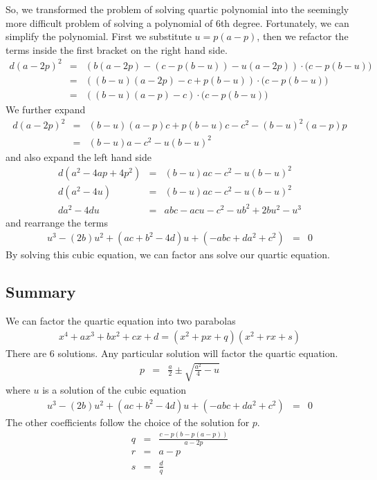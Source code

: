 \documentclass[12pt,a4paper,twoside,openright,BCOR10mm,headsepline,titlepage,abstracton,chapterprefix,final]{scrreprt}
\begin{document}
So, we transformed the problem of solving quartic polynomial into the seemingly more difficult problem of solving a polynomial of 6th degree. Fortunately, we can simplify the polynomial.
First we substitute $u=p(a-p)$, then we refactor the terms inside the first bracket on the right hand side.
\begin{eqnarray}
    d (a-2p)^2 &=& 
    \left(b(a-2p) - (c - p(b - u)) - u(a-2p)\right)
    \cdot
    \big(c - p(b - u)\big)
    \\
    &=& 
    \left((b-u)(a-2p) - c + p(b - u) \right)
    \cdot
    \big(c - p(b - u)\big)
    \\
    &=& 
    \left((b-u)(a-p) - c \right)
    \cdot
    \big(c - p(b - u)\big)
\end{eqnarray}
We further expand
\begin{eqnarray}
    d (a-2p)^2 &=& 
      (b-u)(a-p) c
      + p(b - u) c
      - c^2
      - (b-u)^2(a-p)p
    \\
    &=& (b-u)a - c^2 - u(b-u)^2
\end{eqnarray}
and also expand the left hand side
\begin{eqnarray}
    d (a^2 - 4ap + 4p^2) &=& (b-u)ac - c^2 - u(b-u)^2
    \\
    d (a^2 - 4u) &=& (b-u)ac - c^2 - u(b-u)^2
    \\
    d a^2 - 4 du &=& abc - acu - c^2 - u b^2 + 2bu^2 - u^3
\end{eqnarray}
and rearrange the terms
\begin{eqnarray}
   u^3 
   - (2b)u^2
   + ( ac + b^2 - 4 d ) u
   + (- abc + d a^2 + c^2)
   &=& 
   0
\end{eqnarray}
By solving this cubic equation, we can factor ans solve our quartic equation.


\subsection{Summary}
We can factor the quartic equation into two parabolas
\begin{eqnarray}
 x^4 + a x^3 + b x^2 + c x + d = ( x^2 + p x + q )( x^2 + rx + s) 
\end{eqnarray}
There are 6 solutions.
Any particular solution will factor the quartic equation.
\begin{eqnarray}
  p &=& \frac{a}{2} \pm \sqrt{ \frac{a^2}{4} - u}
\end{eqnarray}
where $u$ is a solution of the cubic equation
\begin{eqnarray}
  u^3 - (2b)u^2 + ( ac + b^2 - 4 d ) u + (- abc + d a^2 + c^2)
  &=& 0
\end{eqnarray}
The other coefficients follow the choice of the solution for $p$.
\begin{eqnarray}
 q &=& \frac{c - p(b - p (a- p))}{a- 2p} \\
 r &=& a - p \\
 s &=& \frac{d}{q}
\end{eqnarray}
\end{document}
